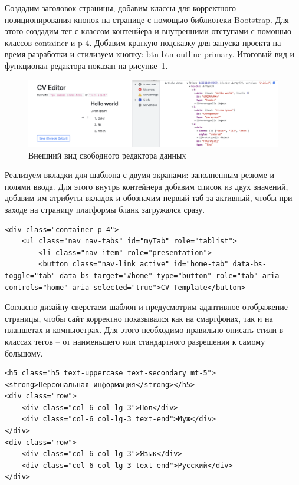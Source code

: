 \documentclass[master, och, diploma]{SCWorks}
\begin{document}
Создадим заголовок страницы, добавим классы для корректного позиционирования кнопок на странице с помощью библиотеки Bootstrap. Для этого создадим тег с классом контенйера и внутренними отступами с помощью классов container и p-4. Добавим краткую подсказку для запуска проекта на время разработки и стилизуем кнопку: btn btn-outline-primary. Итоговый вид и функционал редактора показан на рисунке~\ref{fig:22}.
\begin{figure}[!ht]
    \centering
    \includegraphics[width=12cm]{images/image22.png}
    \caption{\label{fig:22}%
        Внешний вид свободного редактора данных}
\end{figure}

Реализуем вкладки для шаблона с двумя экранами: заполненным резюме и полями ввода. Для этого внутрь контейнера добавим список из двух значений, добавим им атрибуты вкладок и обозначим первый таб за активный, чтобы при заходе на страницу платформы бланк загружался сразу.
\begin{verbatim}
<div class="container p-4">
    <ul class="nav nav-tabs" id="myTab" role="tablist">
        <li class="nav-item" role="presentation">
        <button class="nav-link active" id="home-tab" data-bs-toggle="tab" data-bs-target="#home" type="button" role="tab" aria-controls="home" aria-selected="true">CV Template</button>
\end{verbatim}

Согласно дизайну сверстаем шаблон и предусмотрим адаптивное отображение страницы, чтобы сайт корректно показывался как на смартфонах, так и на планшетах и компьюетрах. Для этого необходимо правильно описать стили в классах тегов – от наименьшего или стандартного разрешения к самому большому. 
\begin{verbatim}
<h5 class="h5 text-uppercase text-secondary mt-5">
<strong>Персональная информация</strong></h5>
<div class="row">
    <div class="col-6 col-lg-3">Пол</div>
    <div class="col-6 col-lg-3 text-end">Муж</div>
</div>
<div class="row">
    <div class="col-6 col-lg-3">Язык</div>
    <div class="col-6 col-lg-3 text-end">Русский</div>
</div>
\end{verbatim}
\end{document}
